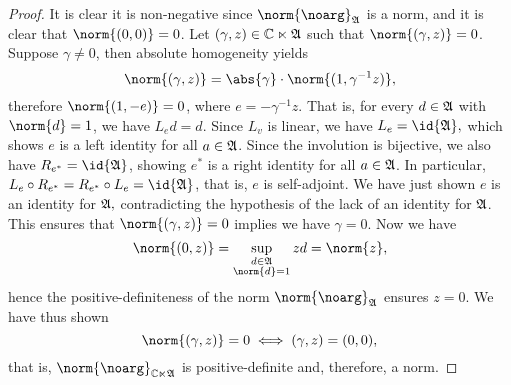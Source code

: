 \begin{proof}
    It is clear it is non-negative since \(\norm{\noarg}_{\algebra{A}}\) is a norm, and it is clear that \(\norm{(0,0)} = 0\). Let \((\gamma, z) \in \mathbb{C} \ltimes \mathfrak{A}\) such that \(\norm{(\gamma, z)} = 0\).  Suppose \(\gamma \neq 0\), then absolute homogeneity yields
    \begin{equation*}
        \norm{(\gamma, z)} = \abs{\gamma}\cdot\norm{(1, \gamma^{-1}z)},
    \end{equation*}
    therefore \(\norm{(1, -e)} = 0\), where \(e = -\gamma^{-1}z\). That is, for every \(d \in \mathfrak{A}\) with \(\norm{d} = 1\), we have \(L_{e}d = d\). Since \(L_v\) is linear, we have \(L_{e} = \id{\algebra{A}},\) which shows \(e\) is a left identity for all \(a \in \mathfrak{A}\). Since the involution is bijective, we also have \(R_{e^*} = \id{\algebra{A}}\), showing \(e^*\) is a right identity for all \(a \in \mathfrak{A}\). In particular, \(L_e \circ R_{e^*} = R_{e^*}\circ L_e = \id{\algebra{A}}\), that is, \(e\) is self-adjoint. We have just shown \(e\) is an identity for \(\mathfrak{A},\) contradicting the hypothesis of the lack of an identity for \(\mathfrak{A}\). This ensures that \(\norm{(\gamma, z)} = 0\) implies we have \(\gamma = 0\). Now we have
    \begin{equation*}
        \norm{(0, z)} = \sup_{\substack{d \in \algebra{A}\\\norm{d} = 1}}{zd} = \norm{z},
    \end{equation*}
    hence the positive-definiteness of the norm \(\norm{\noarg}_{\algebra{A}}\) ensures \(z = 0\). We have thus shown
    \begin{equation*}
        \norm{(\gamma, z)} = 0 \iff (\gamma,z) = (0,0),
    \end{equation*}
    that is, \(\norm{\noarg}_{\mathbb{C} \ltimes \algebra{A}}\) is positive-definite and, therefore, a norm.


\end{proof}

